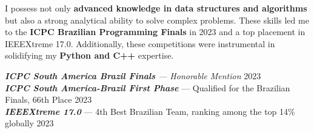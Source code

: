 \vspace*{3pt}  
I possess not only \textbf{advanced knowledge in data structures and algorithms} but also a strong analytical ability  
to solve complex problems. These skills led me to the \textbf{ICPC Brazilian Programming Finals} in 2023 and a top placement  
in IEEEXtreme 17.0. Additionally, these competitions were instrumental in solidifying my \textbf{Python and C++} expertise.  

\vspace*{7pt}  
\textit{\textbf{ICPC South America Brazil Finals} --- Honorable Mention} \hfill 2023\\  
\textit{\textbf{ICPC South America-Brazil First Phase}} --- Qualified for the Brazilian Finals, 66th Place \hfill 2023\\  
\textit{\textbf{IEEEXtreme 17.0}} --- 4th Best Brazilian Team, ranking among the top 14\% globally \hfill 2023\\  
